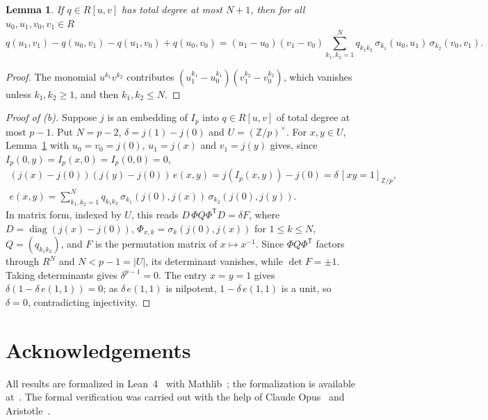 \documentclass[11pt]{article}
\newtheorem{lemma}{Lemma}
\theoremstyle{definition}
\newcommand{\Z}{\mathbb{Z}}
\begin{document}
\begin{lemma}\label{lem:mixed}
If $q\in R[u,v]$ has total degree at most $N+1$, then for all $u_0,u_1,v_0,v_1\in R$
\[
  q(u_1,v_1)-q(u_0,v_1)-q(u_1,v_0)+q(u_0,v_0)=(u_1-u_0)(v_1-v_0)\sum_{k_1,k_2=1}^{N}
  q_{k_1k_2}\,\sigma_{k_1}(u_0,u_1)\,\sigma_{k_2}(v_0,v_1).
\]
\end{lemma}

\begin{proof}
The monomial $u^{k_1}v^{k_2}$ contributes $(u_1^{k_1}-u_0^{k_1})(v_1^{k_2}-v_0^{k_2})$, which
vanishes unless $k_1,k_2\ge 1$, and then $k_1,k_2\le N$.
\end{proof}

\begin{proof}[Proof of (b)]
Suppose $j$ is an embedding of $I_p$ into $q\in R[u,v]$ of total degree at most $p-1$. Put
$N=p-2$, $\delta=j(1)-j(0)$ and $U=(\Z/p)^\times$. For
$x,y\in U$, Lemma~\ref{lem:mixed} with $u_0=v_0=j(0)$, $u_1=j(x)$ and $v_1=j(y)$ gives, since
$I_p(0,y)=I_p(x,0)=I_p(0,0)=0$,
\begin{gather*}
  (j(x)-j(0))(j(y)-j(0))\,e(x,y)=j(I_p(x,y))-j(0)=\delta\,[xy=1]_{\Z/p},\\
  e(x,y)=\sum_{k_1,k_2=1}^{N}q_{k_1k_2}\,\sigma_{k_1}(j(0),j(x))\,\sigma_{k_2}(j(0),j(y)).
\end{gather*}
In matrix form, indexed by $U$, this reads $D\,\Phi Q\Phi^{\mathsf T}D=\delta F$, where
$D=\operatorname{diag}(j(x)-j(0))$, $\Phi_{x,k}=\sigma_k(j(0),j(x))$ for $1\le k\le N$,
$Q=(q_{k_1k_2})$, and $F$ is the permutation matrix of $x\mapsto x^{-1}$. Since
$\Phi Q\Phi^{\mathsf T}$ factors through $R^N$ and $N<p-1=|U|$, its determinant vanishes, while
$\det F=\pm1$. Taking determinants gives $\delta^{p-1}=0$. The entry $x=y=1$ gives
$\delta(1-\delta\,e(1,1))=0$; as $\delta\,e(1,1)$ is nilpotent, $1-\delta\,e(1,1)$ is a unit, so
$\delta=0$, contradicting injectivity.
\end{proof}

\section*{Acknowledgements}
All results are formalized in Lean~4~\cite{lean4} with Mathlib~\cite{mathlib}; the formalization
is available at~\cite{hombin}.
The formal verification was carried out with the help of Claude Opus~\cite{claude} and Aristotle~\cite{aristotle}.
\end{document}
